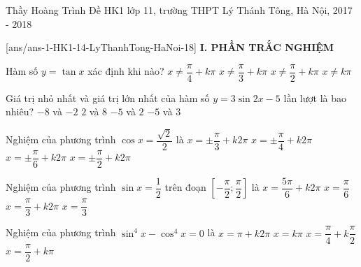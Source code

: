 \begin{name}
{Thầy Hoàng Trình}
{Đề HK1 lớp 11, trường THPT Lý Thánh Tông, Hà Nội, 2017 - 2018}
\end{name}
\setcounter{ex}{0}\setcounter{bt}{0}
[ans/ans-1-HK1-14-LyThanhTong-HaNoi-18]
\noindent\textbf{I. PHẦN TRẮC NGHIỆM}
\begin{ex}%
Hàm số $y=\tan x$ xác định khi nào? 
\choice
{$x\ne \dfrac{\pi}{4}+k\pi$}
{$x\ne \dfrac{\pi}{3}+k\pi$}
{\True $x\ne \dfrac{\pi}{2}+k\pi$}
{$x\ne k\pi$}
\end{ex}
\begin{ex}%
Giá trị nhỏ nhất và giá trị lớn nhất của hàm số $y=3\sin {2x}-5$  lần lượt là bao nhiêu?	
	\choice
	{\True $-8$ và $-2$}
	{$2$ và $8$}
	{$-5$ và $2$}
	{$-5$ và $3$}
\end{ex}
\begin{ex}%
	Nghiệm của phương trình $\cos x = \dfrac{\sqrt{2}}{2}$ là
	\choice
	{$x=\pm \dfrac{\pi}{3}+k2\pi$}
	{\True $x=\pm \dfrac{\pi}{4}+k2\pi$}
	{$x=\pm \dfrac{\pi}{6}+k2\pi$}
	{$x=\pm \dfrac{\pi}{2}+k2\pi$}
\end{ex}
\begin{ex}%
	Nghiệm của phương trình $\sin x = \dfrac{1}{2}$   trên đoạn $\left[-\dfrac{\pi}{2};\dfrac{\pi}{2}\right]$  là
	\choice
	{$x=\dfrac{5\pi}{6}+k2\pi$}
	{\True $x=\dfrac{\pi}{6}$}
	{$x=\dfrac{\pi}{3}+k2\pi$}
	{$x=\dfrac{\pi}{3}$}
\end{ex}
\begin{ex}%
	Nghiệm của phương trình $\sin^4 x-\cos^4x=0$ là 
	\choice
	{$x=\pi+k2\pi$}
	{$x=k\pi$}
	{\True $x=\dfrac{\pi}{4}+k\dfrac{\pi}{2}$}
	{$x=\dfrac{\pi}{2}+k\pi$}
\end{ex}
